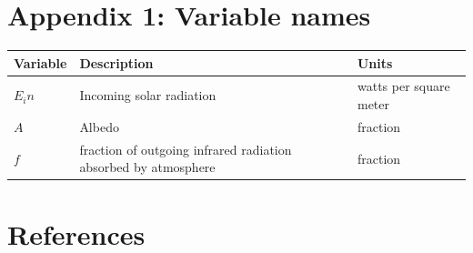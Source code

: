 \documentclass[12pt]{article} %
\begin{document}
\newpage
\section{Appendix 1: Variable names}

\begin{center}
\begin{tabular}{|m{2 cm}| m{6 cm}| m{6 cm}|} \hline
\textbf{Variable} & \textbf{Description} & \textbf{Units}\\ \hline
$E_in$ & Incoming solar radiation & watts per square meter\\ \hline
$A$ & Albedo & fraction\\ \hline
$f$  & fraction of outgoing infrared radiation absorbed by atmosphere & fraction \\ \hline
\end{tabular}
\end{center}


\newpage
\section{References}
\label{sec:references}
\end{document}
